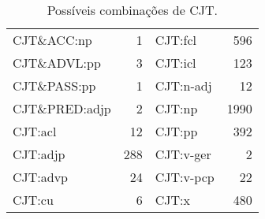 \begin{table}[!h]
    \centering
    \begin{tabular}{|l|r|l|r|}
        \hline
        CJT\&ACC:np & 1 & CJT:fcl & 596\\
        CJT\&ADVL:pp & 3 & CJT:icl & 123\\
        CJT\&PASS:pp & 1 & CJT:n-adj & 12\\
        CJT\&PRED:adjp & 2 & CJT:np & 1990\\
        CJT:acl & 12 & CJT:pp & 392\\
        CJT:adjp & 288 & CJT:v-ger & 2\\
        CJT:advp & 24 & CJT:v-pcp & 22\\
        CJT:cu & 6 & CJT:x & 480\\
        \hline
    \end{tabular}
    \caption{Possíveis combinações de CJT.}
    \label{tab:bosque_CJT}
\end{table}